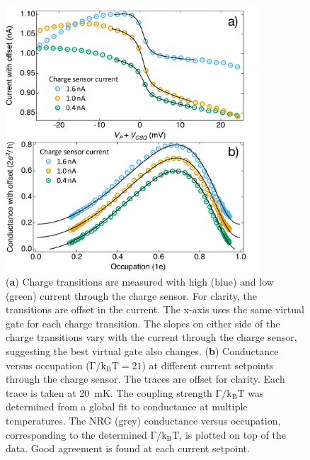 \begin{figure}[!hbt]
 \begin{center}
 \includegraphics[width=0.85\textwidth]{figures/ch3/figure17.pdf}
 \caption[Conductance versus Occupation : Varying Charge Sensor Current]{\label{fig:ch3/cond_occ_QPC_vs_ct} 
 (\textbf{a}) Charge transitions are measured with high (blue) and low (green) current through the charge sensor. For clarity, the transitions are offset in the current. The x-axis uses the same virtual gate for each charge transition. The slopes on either side of the charge transitions vary with the current through the charge sensor, suggesting the best virtual gate also changes. (\textbf{b}) Conductance versus occupation ($\mathrm{\Gamma/k_BT=21}$) at different current setpoints through the charge sensor. The traces are offset for clarity. Each trace is taken at \qty{20}{mK}. The coupling strength $\mathrm{\Gamma/k_BT}$ was determined from a global fit to conductance at multiple temperatures. The NRG (grey) conductance versus occupation, corresponding to the determined $\mathrm{\Gamma/k_BT}$, is plotted on top of the data. Good agreement is found at each current setpoint.}
 \end{center}
\end{figure}


